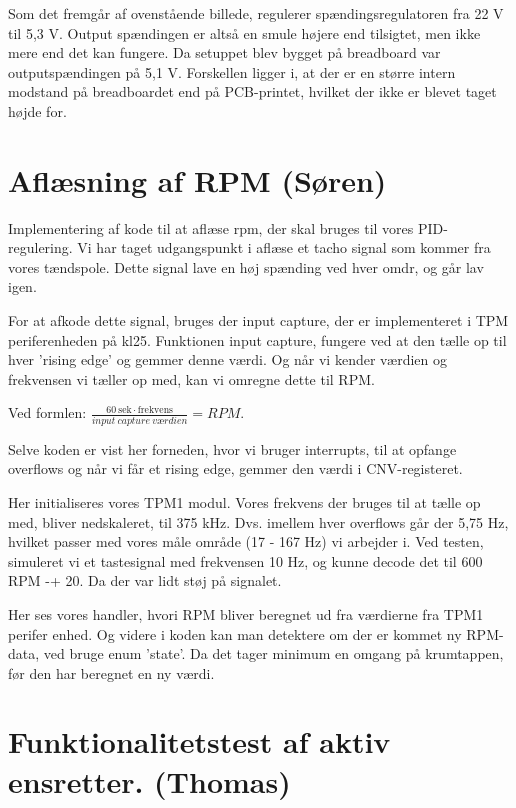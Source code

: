Som det fremgår af ovenstående billede, regulerer spændingsregulatoren fra 22 V til 5,3 V. Output spændingen er altså en smule højere end tilsigtet, men ikke mere end det kan fungere. Da setuppet blev bygget på breadboard var outputspændingen på 5,1 V. Forskellen ligger i, at der er en større intern modstand på breadboardet end på PCB-printet, hvilket der ikke er blevet taget højde for. 
\clearpage
\section{Aflæsning af RPM (Søren)}
\label{sec:aflasning-af-rpm}

Implementering af kode til at aflæse rpm, der skal bruges til vores PID-regulering. Vi har taget udgangspunkt i aflæse et tacho signal som kommer fra vores tændspole. Dette signal lave en høj spænding ved hver omdr, og går lav igen. 

For at afkode dette signal, bruges der input capture, der er implementeret i TPM periferenheden på kl25. Funktionen input capture, fungere ved at den tælle op til hver ’rising edge’ og gemmer denne værdi. Og når vi kender værdien og frekvensen vi tæller op med, kan vi omregne dette til RPM. 

Ved formlen: $\frac{\mathrm{60\ sek}\cdot\mathrm{frekvens}}{input\ capture\ værdien} = RPM$.

Selve koden er vist her forneden, hvor vi bruger interrupts, til at opfange overflows og når vi får et rising edge, gemmer den værdi i CNV-registeret.
\clearpage


Her initialiseres vores TPM1 modul. Vores frekvens der bruges til at tælle op med, bliver nedskaleret, til 375 kHz. Dvs. imellem hver overflows går der 5,75 Hz, hvilket passer med vores måle område (17 - 167 Hz) vi arbejder i. 
Ved testen, simuleret vi et tastesignal med frekvensen 10 Hz, og kunne decode det til 600 RPM -+ 20. Da der var lidt støj på signalet.



Her ses vores handler, hvori RPM bliver beregnet ud fra værdierne fra TPM1 perifer enhed. Og videre i koden kan man detektere om der er kommet ny RPM-data, ved bruge enum ’state’. Da det tager minimum en omgang på krumtappen, før den har beregnet en ny værdi.
\clearpage

\section{Funktionalitetstest af aktiv ensretter. (Thomas)}
\label{sec:funkt-af-aktiv}

